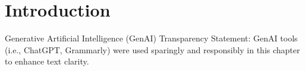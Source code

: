 \documentclass[
  letterpaper,
]{tex/uofsthesis-cs}
\begin{document}

% 	


%  	



\chapter{Introduction}\label{introduction}

Generative Artificial Intelligence (GenAI) Transparency Statement: GenAI
tools (i.e., ChatGPT, Grammarly) were used sparingly and responsibly in
this chapter to enhance text clarity.
\end{document}
